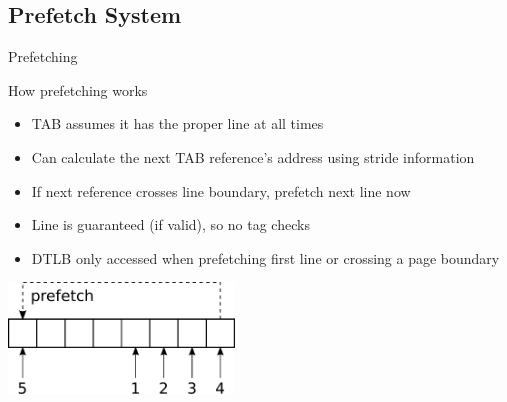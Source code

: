 \documentclass{beamer}
\begin{document}
\subsection{Prefetch System}
\begin{frame}{Prefetching}
   \begin{block}{How prefetching works}
      \begin{itemize}
         \item TAB assumes it has the proper line at all times
         \item Can calculate the next TAB reference's address using stride information
         \item If next reference crosses line boundary, prefetch next line now
         \item Line is guaranteed (if valid), so no tag checks
         \item DTLB only accessed when prefetching first line or crossing
            a page boundary
      \end{itemize}
   \end{block}
   \begin{center}
      \includegraphics[width=0.45\textwidth]{figures/prefetch.pdf}
   \end{center}
\end{frame}
\end{document}
